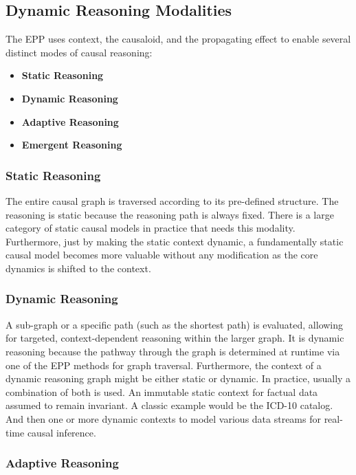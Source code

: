   
%
%
\subsection{Dynamic Reasoning Modalities}
\label{sec:epp_dynamic_modalities}

  
The EPP uses context, the causaloid, and the propagating effect to enable several distinct modes of causal reasoning: 

\begin{itemize}	
	\item \textbf{Static Reasoning}
	\item \textbf{Dynamic Reasoning}
	\item \textbf{Adaptive Reasoning} 
	\item \textbf{Emergent Reasoning} 
\end{itemize}


\subsubsection{Static Reasoning}

The entire causal graph is traversed according to its pre-defined structure. The reasoning is static because the reasoning path is always fixed. There is a large category of static causal models in practice that needs this modality. Furthermore, just by making the static context dynamic, a fundamentally static causal model becomes more valuable without any modification as the core dynamics is shifted to the context.  

\subsubsection{Dynamic Reasoning}


A sub-graph or a specific path (such as the shortest path) is evaluated, allowing for targeted, context-dependent reasoning within the larger graph. It is dynamic reasoning because the pathway through the graph is determined at runtime via one of the EPP methods for graph traversal. Furthermore, the context of a dynamic reasoning graph might be either static or dynamic. In practice, usually a combination of both is used. An immutable static context for factual data assumed to remain invariant. A classic example would be the ICD-10 catalog. And then one or more dynamic contexts to model various data streams for real-time causal inference. 

\subsubsection{Adaptive Reasoning}


